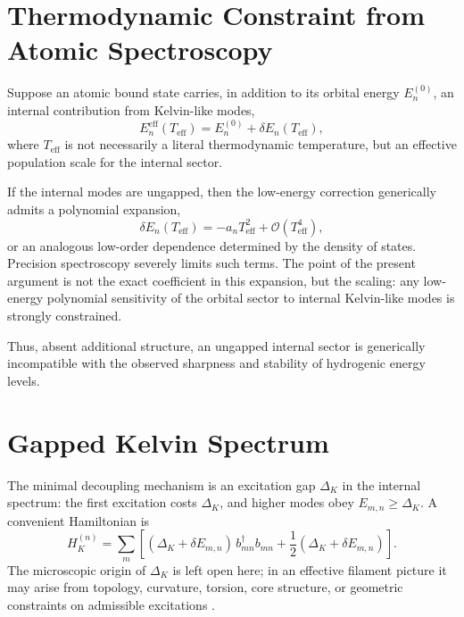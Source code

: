 \documentclass[pdflatex,sn-mathphys-num]{sn-jnl}
\begin{document}
    \section{Thermodynamic Constraint from Atomic Spectroscopy}\label{sec:constraint}
        Suppose an atomic bound state carries, in addition to its orbital energy $E_n^{(0)}$, an internal contribution from Kelvin-like modes,
        \begin{equation}
            E_n^{\mathrm{eff}}(T_{\mathrm{eff}})
            =
            E_n^{(0)} + \delta E_n(T_{\mathrm{eff}}),
        \end{equation}
        where $T_{\mathrm{eff}}$ is not necessarily a literal thermodynamic temperature, but an effective population scale for the internal sector.

        If the internal modes are ungapped, then the low-energy correction generically admits a polynomial expansion,
        \begin{equation}
            \delta E_n(T_{\mathrm{eff}})
            =
            - a_n T_{\mathrm{eff}}^2 + \mathcal{O}(T_{\mathrm{eff}}^4),
            \label{eq:poly_correction}
        \end{equation}
        or an analogous low-order dependence determined by the density of states. Precision spectroscopy severely limits such terms. The point of the present argument is not the exact coefficient in this expansion, but the scaling: any low-energy polynomial sensitivity of the orbital sector to internal Kelvin-like modes is strongly constrained.

        Thus, absent additional structure, an ungapped internal sector is generically incompatible with the observed sharpness and stability of hydrogenic energy levels.

    \section{Gapped Kelvin Spectrum}\label{sec:gap}
        The minimal decoupling mechanism is an excitation gap $\Delta_K$ in the internal spectrum: the first excitation costs $\Delta_K$, and higher modes obey $E_{m,n}\ge\Delta_K$. A convenient Hamiltonian is
        \begin{equation}
            H_K^{(n)} = \sum_m \left[
                                   (\Delta_K+\delta E_{m,n})\, b_{mn}^\dagger b_{mn}
                                   + \frac{1}{2}(\Delta_K+\delta E_{m,n})
            \right].
        \end{equation}
        The microscopic origin of $\Delta_K$ is left open here; in an effective filament picture it may arise from topology, curvature, torsion, core structure, or geometric constraints on admissible excitations \cite{Ricca1996}.
\end{document}
